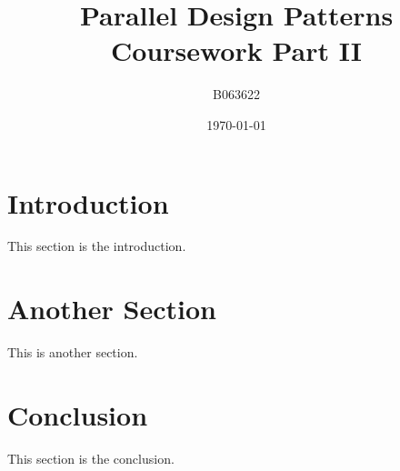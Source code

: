 \documentclass[11pt, oneside]{article}   %
\title{Parallel Design Patterns Coursework Part II}
\author{B063622}
\date{\today}
\begin{document}
\maketitle

\newpage

\tableofcontents

\newpage


\section{Introduction}
This section is the introduction.

\newpage

\section{Another Section}
This is another section.

\section{Conclusion}
This section is the conclusion.
\end{document}
